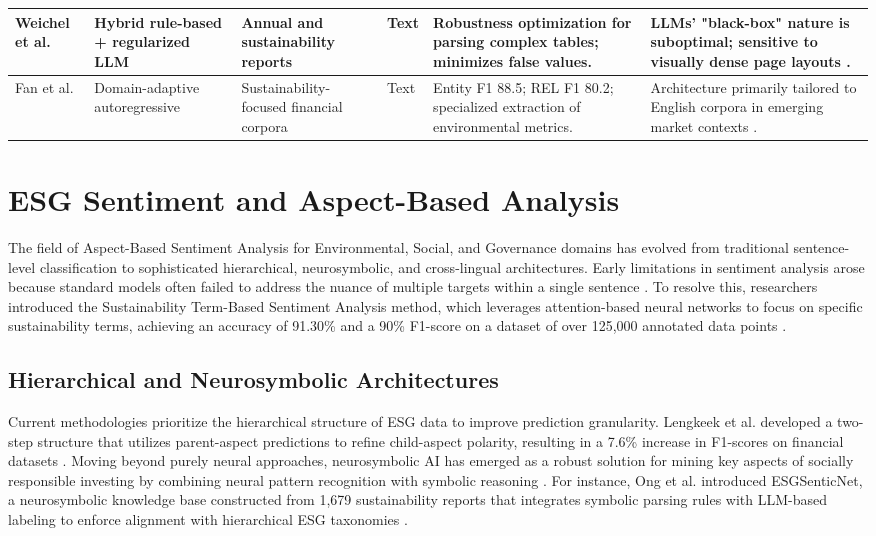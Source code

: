 \documentclass[english, online, cse, master]{dithesis}
\begin{document}
\begin{landscape}
\begin{table}[p]
\begin{tabularx}{\linewidth}{|p{1.8cm}|X|X|p{1.8cm}|X|X|}
Weichel et al.  \parencite{hendrik_weichel_5ea70935} & Hybrid rule-based + regularized LLM & Annual and sustainability reports & Text & Robustness optimization for parsing complex tables; minimizes false values. & LLMs' "black-box" nature is suboptimal; sensitive to visually dense page layouts  \parencite{hendrik_weichel_5ea70935}. \\ \hline
Fan et al.  \parencite{j__h__fan_97bd591d} & Domain-adaptive autoregressive & Sustainability-focused financial corpora & Text & Entity F1 88.5; REL F1 80.2; specialized extraction of environmental metrics. & Architecture primarily tailored to English corpora in emerging market contexts  \parencite{j__h__fan_97bd591d}. \\ \hline
\end{tabularx}
\end{table}
\end{landscape}

\section{ESG Sentiment and Aspect-Based Analysis}

The field of Aspect-Based Sentiment Analysis for Environmental, Social, and Governance domains has evolved from traditional sentence-level classification to sophisticated hierarchical, neurosymbolic, and cross-lingual architectures. Early limitations in sentiment analysis arose because standard models often failed to address the nuance of multiple targets within a single sentence  \parencite{blaise_sandwidi_c58b16e0}. To resolve this, researchers introduced the Sustainability Term-Based Sentiment Analysis method, which leverages attention-based neural networks to focus on specific sustainability terms, achieving an accuracy of 91.30\% and a 90\% F1-score on a dataset of over 125,000 annotated data points  \parencite{blaise_sandwidi_c58b16e0}.
\subsection{Hierarchical and Neurosymbolic Architectures}

Current methodologies prioritize the hierarchical structure of ESG data to improve prediction granularity. Lengkeek et al.  \parencite{matteo_lengkeek_5d9f2a4e} developed a two-step structure that utilizes parent-aspect predictions to refine child-aspect polarity, resulting in a 7.6\% increase in F1-scores on financial datasets  \parencite{matteo_lengkeek_5d9f2a4e}. Moving beyond purely neural approaches, neurosymbolic AI has emerged as a robust solution for mining key aspects of socially responsible investing by combining neural pattern recognition with symbolic reasoning  \parencite{wihan_van_der_heever_5ff35709}. For instance, Ong et al.  \parencite{keane_ong_8fec4760} introduced ESGSenticNet, a neurosymbolic knowledge base constructed from 1,679 sustainability reports that integrates symbolic parsing rules with LLM-based labeling to enforce alignment with hierarchical ESG taxonomies  \parencite{keane_ong_8fec4760}.
\end{document}
